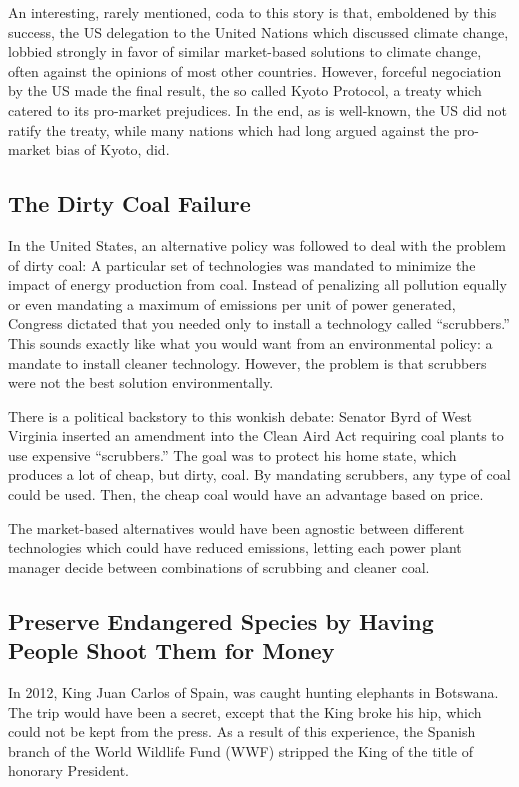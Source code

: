 An interesting, rarely mentioned, coda to this story is that, emboldened by
this success, the US delegation to the United Nations which discussed climate
change, lobbied strongly in favor of similar market-based solutions to climate
change, often against the opinions of most other countries. However, forceful
negociation by the US made the final result, the so called Kyoto Protocol, a
treaty which catered to its pro-market prejudices. In the end, as is
well-known, the US did not ratify the treaty, while many nations which had long
argued against the pro-market bias of Kyoto, did.

\subsection{The Dirty Coal Failure}

In the United States, an alternative policy was followed to deal with the
problem of dirty coal: A particular set of technologies was mandated to
minimize the impact of energy production from coal. Instead of penalizing all
pollution equally or even mandating a maximum of emissions per unit of power
generated, Congress dictated that you needed only to install a technology
called ``scrubbers.'' This sounds exactly like what you would want from an
environmental policy: a mandate to install cleaner technology. However, the
problem is that scrubbers were not the best solution environmentally.

There is a political backstory to this wonkish debate: Senator Byrd of West
Virginia inserted an amendment into the Clean Aird Act requiring coal plants to
use expensive ``scrubbers.'' The goal was to protect his home state, which
produces a lot of cheap, but dirty, coal. By mandating scrubbers, any type of
coal could be used. Then, the cheap coal would have an advantage based on
price.

The market-based alternatives would have been agnostic between different
technologies which could have reduced emissions, letting each power plant
manager decide between combinations of scrubbing and cleaner coal.

\subsection{Preserve Endangered Species by Having People Shoot Them for Money}

In 2012, King Juan Carlos of Spain, was caught hunting elephants in Botswana.
The trip would have been a secret, except that the King broke his hip, which
could not be kept from the press. As a result of this experience, the Spanish
branch of the World Wildlife Fund (WWF) stripped the King of the title of
honorary President.


